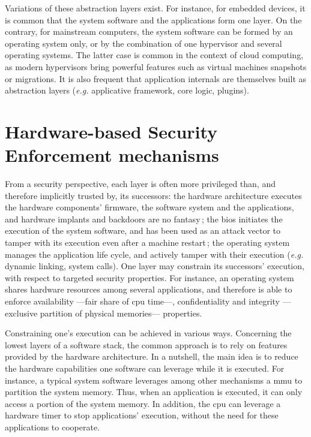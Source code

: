 Variations of these abstraction layers exist.
%
For instance, for embedded devices, it is common that the system software and
the applications form one layer.
%
On the contrary, for mainstream computers, the system software can be formed by
an operating system only, or by the combination of one hypervisor and several
operating systems.
%
The latter case is common in the context of cloud computing, as modern
hypervisors bring powerful features such as virtual machines snapshots or
migrations.
%
It is also frequent that application internals are themselves built as
abstraction layers (\emph{e.g.} applicative framework, core logic, plugins).

\section{Hardware-based Security Enforcement mechanisms}

From a security perspective, each layer is often more privileged than, and
therefore implicitly trusted by, its successors:
%
the hardware architecture executes the hardware components' firmware, the
software system and the applications, and hardware implants and backdoors are no
fantasy\,\cite{yang2016a2};
%
the \ac{bios} initiates the execution of the system software, and has been used
as an attack vector to tamper with its execution even after a machine
restart\,\cite{embleton2013smm};
%
the operating system manages the application life cycle, and actively tamper
with their execution (\emph{e.g.} dynamic linking, system calls).
%
One layer may constrain its successors' execution, with respect to targeted
security properties.
%
For instance, an operating system shares hardware resources among several
applications, and therefore is able to enforce availability ---fair share of
\ac{cpu} time---, confidentiality and integrity ---exclusive partition of
physical memories--- properties.

Constraining one's execution can be achieved in various ways.
%
Concerning the lowest layers of a software stack, the common approach is to rely
on features provided by the hardware architecture.
%
In a nutshell, the main idea is to reduce the hardware capabilities one software
can leverage while it is executed.
%
For instance, a typical system software leverages among other mechanisms a
\ac{mmu} to partition the system memory.
%
Thus, when an application is executed, it can only access a portion of the
system memory.
%
In addition, the \ac{cpu} can leverage a hardware timer to stop applications'
execution, without the need for these applications to cooperate.

